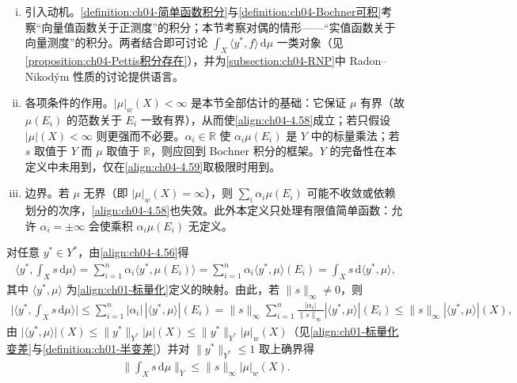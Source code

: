 \documentclass[../../main.tex]{subfiles}%
\begin{document}
\begin{remark}\label{remark:ch04-向量测度积分动机}
\begin{enumerate}[(i)]
\item 引入动机。\cref{definition:ch04-简单函数积分}与\cref{definition:ch04-Bochner可积}考察“向量值函数关于正测度”的积分；本节考察对偶的情形——“实值函数关于向量测度”的积分。两者结合即可讨论 $\int_X\langle y^*,f\rangle\,\mathrm{d}\mu$ 一类对象（见\cref{proposition:ch04-Pettis积分存在}），并为\cref{subsection:ch04-RNP}中 Radon--Nikodým 性质的讨论提供语言。

\item 各项条件的作用。$|\mu|_w(X)<\infty$ 是本节全部估计的基础：它保证 $\mu$ 有界（故 $\mu(E_i)$ 的范数关于 $E_i$ 一致有界），从而使\eqref{align:ch04-4.58}成立；若只假设 $|\mu|(X)<\infty$ 则更强而不必要。$\alpha_i\in\mathbb{R}$ 使 $\alpha_i\mu(E_i)$ 是 $Y$ 中的标量乘法；若 $s$ 取值于 $Y$ 而 $\mu$ 取值于 $\mathbb{R}$，则应回到 Bochner 积分的框架。$Y$ 的完备性在本定义中未用到，仅在\eqref{align:ch04-4.59}取极限时用到。

\item 边界。若 $\mu$ 无界（即 $|\mu|_w(X)=\infty$），则 $\sum_i\alpha_i\mu(E_i)$ 可能不收敛或依赖划分的次序，\eqref{align:ch04-4.58}也失效。此外本定义只处理有限值简单函数：允许 $\alpha_i=\pm\infty$ 会使乘积 $\alpha_i\mu(E_i)$ 无定义。
\end{enumerate}
\end{remark}

对任意 $y^*\in Y^*$，由\eqref{align:ch04-4.56}得
\begin{align*}
\Big\langle y^*,\int_X s\,\mathrm{d}\mu\Big\rangle=\sum_{i=1}^n\alpha_i\langle y^*,\mu(E_i)\rangle=\sum_{i=1}^n\alpha_i\langle y^*,\mu\rangle(E_i)=\int_X s\,\mathrm{d}\langle y^*,\mu\rangle,
\end{align*}
其中 $\langle y^*,\mu\rangle$ 为\eqref{align:ch01-标量化}定义的映射。由此，若 $\|s\|_\infty\neq0$，则
\begin{align*}
\Big|\Big\langle y^*,\int_X s\,\mathrm{d}\mu\Big\rangle\Big|
\leqslant\sum_{i=1}^n|\alpha_i|\,|\langle y^*,\mu\rangle|(E_i)
=\|s\|_\infty\sum_{i=1}^n\frac{|\alpha_i|}{\|s\|_\infty}|\langle y^*,\mu\rangle|(E_i)
\leqslant\|s\|_\infty|\langle y^*,\mu\rangle|(X),
\end{align*}
由 $\big|\langle y^*,\mu\rangle\big|(X)\leqslant\|y^*\|_{Y^*}|\mu|(X)\leqslant\|y^*\|_{Y^*}|\mu|_w(X)$（见\eqref{align:ch01-标量化变差}与\cref{definition:ch01-半变差}）并对 $\|y^*\|_{Y^*}\leqslant1$ 取上确界得
\begin{align}
\Big\|\int_X s\,\mathrm{d}\mu\Big\|_Y\leqslant\|s\|_\infty|\mu|_w(X). \label{align:ch04-4.58}
\end{align}
\end{document}
